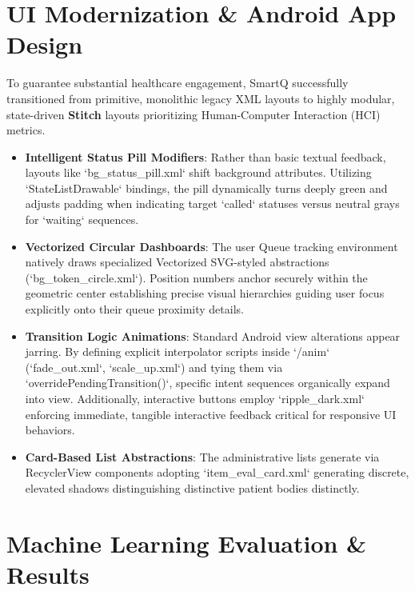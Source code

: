 \documentclass[12pt,a4paper]{article}
\begin{document}
\section{UI Modernization \& Android App Design}

To guarantee substantial healthcare engagement, SmartQ successfully transitioned from primitive, monolithic legacy XML layouts to highly modular, state-driven \textbf{Stitch} layouts prioritizing Human-Computer Interaction (HCI) metrics.

\begin{itemize}
    \item \textbf{Intelligent Status Pill Modifiers}: Rather than basic textual feedback, layouts like `bg_status_pill.xml` shift background attributes. Utilizing `StateListDrawable` bindings, the pill dynamically turns deeply green and adjusts padding when indicating target `called` statuses versus neutral grays for `waiting` sequences.
    \item \textbf{Vectorized Circular Dashboards}: The user Queue tracking environment natively draws specialized Vectorized SVG-styled abstractions (`bg_token_circle.xml`). Position numbers anchor securely within the geometric center establishing precise visual hierarchies guiding user focus explicitly onto their queue proximity details.
    \item \textbf{Transition Logic Animations}: Standard Android view alterations appear jarring. By defining explicit interpolator scripts inside `/anim` (`fade_out.xml`, `scale_up.xml`) and tying them via `overridePendingTransition()`, specific intent sequences organically expand into view. Additionally, interactive buttons employ `ripple_dark.xml` enforcing immediate, tangible interactive feedback critical for responsive UI behaviors.
\item \textbf{Card-Based List Abstractions}: The administrative lists generate via RecyclerView components adopting `item_eval_card.xml` generating discrete, elevated shadows distinguishing distinctive patient bodies distinctly.
\end{itemize}

\section{Machine Learning Evaluation \& Results}
\end{document}
